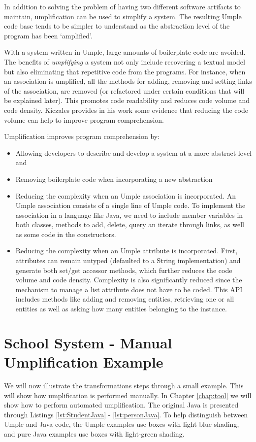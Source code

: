 In addition to solving the problem of having two different software artifacts to maintain,   umplification can be used to simplify a system. The resulting Umple code base tends to be simpler to understand \cite{UmpleMAIN} as the abstraction level of the program has been `amplified'.

With a system written in Umple, large amounts of boilerplate code are avoided. The benefits of \textit{umplifying} a system not only include recovering a textual model but also eliminating that repetitive code from the programs. For instance, when an association is umplified, all the methods for adding, removing and setting links of the association, are removed (or refactored under certain conditions that will be explained later). This promotes code readability and reduces code volume and code density. Kiczales provides in his work \cite{kiczalesAOP} some evidence that reducing the code volume can help to improve program comprehension.

Umplification improves program comprehension by:
\begin{itemize}
\item Allowing developers to describe and develop a system at a more abstract level and

\item Removing boilerplate code when incorporating a new abstraction

\item Reducing the complexity when an Umple association is incorporated. An Umple association consists of a single line of Umple code. To implement the association in a language like Java, we need to include member variables in both classes, methods to add, delete, query an iterate through links, as well as some code in the constructors.

\item Reducing the complexity when an Umple attribute is incorporated. First, attributes can remain untyped (defaulted to a String implementation) and generate both set/get accessor methods, which further reduces the code volume and code density. Complexity is also significantly reduced since the mechanism to manage a list attribute does not have to be coded. This API includes methods like adding and removing entities, retrieving one or all entities as well as asking how many entities belonging to the instance.
\end{itemize}

\section{School System - Manual Umplification Example}
We will now illustrate the transformations steps through a small example. This will show how umplification is performed manually. In Chapter \ref{chap:tool} we will show how to perform automated umplification. The original Java is presented through Listings \ref{lst:StudentJava} - \ref{lst:personJava}.
To help distinguish between Umple and Java code, the Umple examples use boxes with {\color{blue} light-blue}  shading, and pure Java examples use boxes with {\color{green} light-green} shading.

